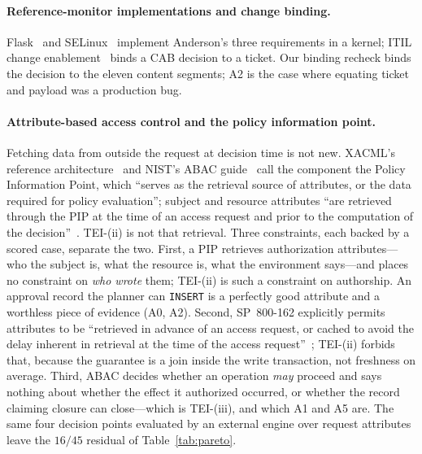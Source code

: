 \documentclass[acmsmall,manuscript,review,anonymous]{acmart}
\renewcommand{\_}{\discretionary{\textunderscore}{}{\textunderscore}}
\begin{document}
\paragraph{Reference-monitor implementations and change binding.}
Flask~\cite{spencer1999flask} and SELinux~\cite{loscocco2001integrating}
implement Anderson's three requirements in a kernel; ITIL change
enablement~\cite{axelos2019itil} binds a CAB decision to a ticket.
Our binding recheck binds the decision to the eleven content segments;
A2 is the case where equating ticket and payload was a production bug.

\paragraph{Attribute-based access control and the policy information point.}
Fetching data from outside the request at decision time is not new.
{XACML}'s reference architecture~\cite{oasis2013xacml} and {NIST}'s {ABAC}
guide~\cite{hu2014abac} call the component the Policy Information Point, which
``serves as the retrieval source of attributes, or the data required for policy
evaluation''; subject and resource attributes ``are retrieved through the {PIP}
at the time of an access request and prior to the computation of the
decision''~\cite{ferraiolo2016abacstandards}. {TEI}-(ii) is not that
retrieval. Three constraints, each backed by a scored case, separate the two. First, a {PIP} retrieves authorization
attributes---who the
subject is, what the resource is, what the environment says---and places no
constraint on \emph{who wrote} them; {TEI}-(ii) is such a constraint on authorship. An approval record the planner can \texttt{INSERT} is a
perfectly good attribute and a worthless piece of evidence ({A0}, {A2}).
Second, {SP}~800-162 explicitly permits attributes to be ``retrieved in
advance of an access request, or cached to avoid the delay inherent in
retrieval at the time of the access request''~\cite{hu2014abac}; {TEI}-(ii)
forbids that, because the guarantee is a join inside the write transaction,
not freshness on average. Third, {ABAC} decides whether an operation
\emph{may} proceed and says nothing about whether the effect it authorized
occurred, or whether the record claiming closure can close---which is
{TEI}-(iii), and which {A1} and {A5} are.
The same four decision points evaluated by an external engine over request
attributes leave the $16/45$ residual of Table~\ref{tab:pareto}.
\end{document}
